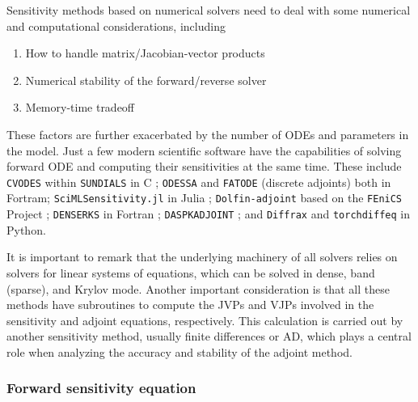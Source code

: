 
Sensitivity methods based on numerical solvers need to deal with some numerical and computational considerations, including
\begin{enumerate}[label=(\roman*)]
    \item How to handle matrix/Jacobian-vector products
    \item Numerical stability of the forward/reverse solver
    \item Memory-time tradeoff
\end{enumerate}
These factors are further exacerbated by the number of ODEs and parameters in the model. 
Just a few modern scientific software have the capabilities of solving forward ODE and computing their sensitivities at the same time. 
These include 
\texttt{CVODES} within \texttt{SUNDIALS} in C \cite{serban2005cvodes, SUNDIALS-hindmarsh2005sundials}; 
\texttt{ODESSA} \cite{ODESSA} and \texttt{FATODE} (discrete adjoints) \cite{FATODE2014} both in Fortram; 
\texttt{SciMLSensitivity.jl} in Julia \cite{rackauckas2020universal}; 
\texttt{Dolfin-adjoint} based on the \texttt{FEniCS} Project \cite{dolfin2013, dolfin2018};
\texttt{DENSERKS} in Fortran \cite{alexe2007denserks}; 
\texttt{DASPKADJOINT} \cite{Cao_Li_Petzold_2002};
and \texttt{Diffrax} \cite{kidger2021on} and \texttt{torchdiffeq} \cite{torchdiffeq} in Python. 

It is important to remark that the underlying machinery of all solvers relies on solvers for linear systems of equations, which can be solved in dense, band (sparse), and Krylov mode. 
Another important consideration is that all these methods have subroutines to compute the JVPs and VJPs involved in the sensitivity and adjoint equations, respectively. 
This calculation is carried out by another sensitivity method, usually finite differences or AD, which plays a central role when analyzing the accuracy and stability of the adjoint method. 

\subsubsection{Forward sensitivity equation}
\label{section:computing-sensitivity-equations}

